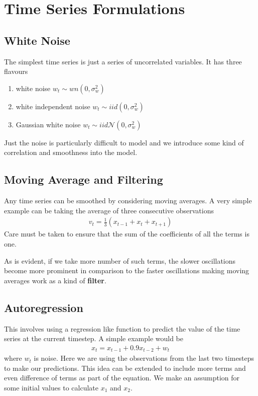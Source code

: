 \documentclass[../../time_series_notes.tex]{subfiles}
\begin{document}
\section{Time Series Formulations}
\subsection{White Noise}
The simplest time series is just a series of uncorrelated variables. It has three flavours
\begin{enumerate}
    \item white noise $w_{t} \sim wn(0, \sigma_{w}^{2})$
    \item white independent noise $w_{t} \sim iid(0, \sigma_{w}^{2})$
    \item Gaussian white noise $w_{t} \sim iid \mathcal{N}(0, \sigma_{w}^{2})$
\end{enumerate}
Just the noise is particularly difficult to model and we introduce some kind of correlation and smoothness into the model.

\subsection{Moving Average and Filtering}
Any time series can be smoothed by considering moving averages. A very simple example can be taking the average of three consecutive observations
\begin{align*}
    v_{t} = \frac{1}{3}(x_{t-1} + x_{t} + x_{t+1})
\end{align*}
Care must be taken to ensure that the sum of the coefficients of all the terms is one.\newline

As is evident, if we take more number of such terms, the slower oscillations become more prominent in comparison to the faster oscillations making moving averages work as a kind of \textbf{filter}.

\subsection{Autoregression}
This involves using a regression like function to predict the value of the time series at the current timestep. A simple example would be
\begin{align*}
    x_{t} = x_{t-1} + 0.9x_{t-2} + w_{t}
\end{align*}
where $w_{t}$ is noise. Here we are using the observations from the last two timesteps to make our predictions. This idea can be extended to include more terms and even difference of terms as part of the equation. We make an assumption for some initial values to calculate $x_{1}$ and $x_{2}$.
\end{document}
